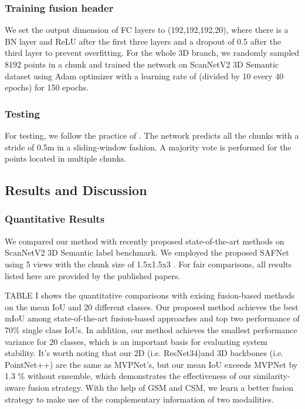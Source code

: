 \documentclass[letterpaper, 10 pt, conference]{ieeeconf}
\begin{document}
\subsubsection{\textbf{Training fusion header}}
We set the output dimension of FC layers to (192,192,192,20), where there is a BN layer and ReLU after the first three layers and a dropout of 0.5 after the third layer to prevent overfitting.
For the whole 3D branch, we randomly sampled 8192 points in a chunk and trained the network on ScanNetV2 3D Semantic dataset using Adam optimizer with a learning rate of  (divided by 10 every 40 epochs) for 150 epochs.

\subsubsection{\textbf{Testing}}
For testing, we follow the practice of  \cite{qi2017pointnet++,jaritz2019multi}. The network predicts all the chunks with a stride of 0.5m in a sliding-window fashion. A majority vote is performed for the points located in multiple chunks.


\subsection{Results and Discussion}
\subsubsection{\textbf{Quantitative Results}}

We compared our method with recently proposed state-of-the-art methods on ScanNetV2 3D Semantic label benchmark. We employed the proposed SAFNet using 5 views with the chunk size of 1.5x1.5x3 . For fair comparisons, all results listed here are provided by the published papers.

TABLE I shows the quantitative comparisons 
with exising fusion-based methods on the mean IoU and 20 different classes. Our proposed method achieves the best mIoU among state-of-the-art fusion-based approaches and top two performance of 70\% single class IoUs. In addition, our method achieves the smallest performance variance for 20 classes, which is an important basis for evaluating system stability. It’s worth noting that our 2D (i.e. ResNet34)and 3D  backbones (i.e. PointNet++) are the same as MVPNet's, but 
our mean IoU exceeds MVPNet by 1.3 \% without ensemble, which demonstrates the effectiveness of our similarity-aware fusion strategy. 
With the help of GSM and CSM, we learn a better fusion strategy to make use of the complementary information of two modailities.
\end{document}
